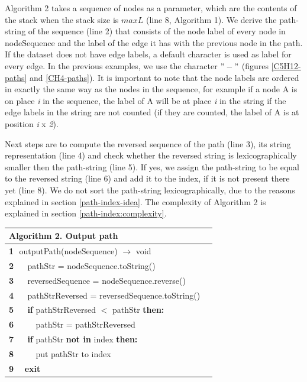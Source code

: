 \documentclass{l4proj}
\theoremstyle{definition}
\begin{document}
Algorithm 2 takes a sequence of nodes as a parameter, which are the contents of the stack when the stack size is $maxL$ (line 8, Algorithm 1). We derive the path-string of the sequence (line 2) that consists of the node label of every node in nodeSequence and the label of the edge it has with the previous node in the path. If the dataset does not have edge labels, a default character is used as label for every edge. In the previous examples, we use the character $"-"$ (figures \ref{C5H12-paths} and \ref{CH4-paths}). It is important to note that the node labels are ordered in exactly the same way as the nodes in the sequence, for example if a node A is on place \textit{i} in the sequence, the label of A will be at place \textit{i} in the string if the edge labels in the string are not counted (if they are counted, the label of A is at position \textit{i} x \textit{2}).\par
Next steps are to compute the reversed sequence of the path (line 3), its string representation (line 4) and check whether the reversed string is lexicographically smaller then the path-string (line 5). If yes, we assign the path-string to be equal to the reversed string (line 6) and add it to the index, if it is not present there yet (line 8). We do not sort the path-string lexicographically, due to the reasons explained in section \ref{path-index-idea}. The complexity of Algorithm 2 is explained in section \ref{path-index:complexity}.\par
\begin{table}[h]
 \centering
 \label{Algorithm 2.}
 \begin{tabular}{l l}
	\textbf{Algorithm 2.} Output path \\\hline
    \small\textbf{1} \,\,\small{outputPath(nodeSequence) $\rightarrow$ void}\\
     \small\textbf{2} \,\,\,\,\,\,\,\,\small{pathStr = nodeSequence.toString()}\\
    \small\textbf{3} \,\,\,\,\,\,\,\,\small{reversedSequence = nodeSequence.reverse()}\\
     \small\textbf{4} \,\,\,\,\,\,\,\,\small{pathStrReversed = reversedSequence.toString()}\\
    \small\textbf{5} \,\,\,\,\,\,\,\,\small{\textbf{if} pathStrReversed $<$ pathStr \textbf{then:}}\\
    \small\textbf{6} \,\,\,\,\,\,\,\,\,\,\,\,\,\,\small{pathStr = pathStrReversed}\\
    \small\textbf{7} \,\,\,\,\,\,\,\,\small{\textbf{if} pathStr \textbf{not in} index \textbf{then:}}\\
    \small\textbf{8} \,\,\,\,\,\,\,\,\,\,\,\,\,\,\small{put pathStr to index}\\
    \small\textbf{9}\,\,\,\,\,\,\,\,\small{\textbf{exit}}\\\hline
 \end{tabular}
\end{table}
\end{document}
